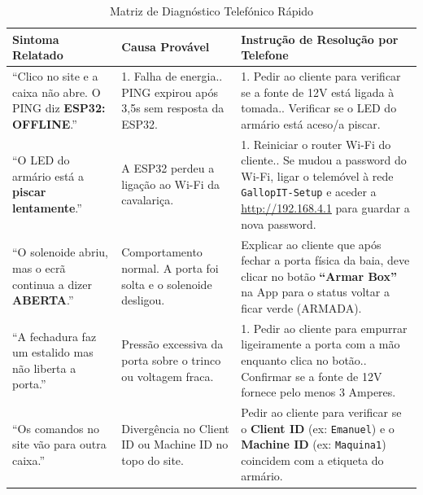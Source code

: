 \documentclass[11pt,a4paper]{article}
\begin{document}
\small
\begin{table}[h!]
\centering
\renewcommand{\arraystretch}{1.25}
\begin{tabular}{@{}p{3.6cm}p{4.2cm}p{8.4cm}@{}}
\toprule
\textbf{Sintoma Relatado} & \textbf{Causa Provável} & \textbf{Instrução de Resolução por Telefone} \\ \midrule
``Clico no site e a caixa não abre. O PING diz \textbf{ESP32: OFFLINE}.'' & 1. Falha de energia.\newline 2. PING expirou após 3,5s sem resposta da ESP32. & 1. Pedir ao cliente para verificar se a fonte de 12V está ligada à tomada.\newline 2. Verificar se o LED do armário está aceso/a piscar. \\ \midrule
``O LED do armário está a \textbf{piscar lentamente}.'' & A ESP32 perdeu a ligação ao Wi-Fi da cavalariça. & 1. Reiniciar o router Wi-Fi do cliente.\newline 2. Se mudou a password do Wi-Fi, ligar o telemóvel à rede \texttt{GallopIT-Setup} e aceder a \url{http://192.168.4.1} para guardar a nova password. \\ \midrule
``O solenoide abriu, mas o ecrã continua a dizer \textbf{ABERTA}.'' & Comportamento normal. A porta foi solta e o solenoide desligou. & Explicar ao cliente que após fechar a porta física da baia, deve clicar no botão \textbf{``Armar Box''} na App para o status voltar a ficar verde (ARMADA). \\ \midrule
``A fechadura faz um estalido mas não liberta a porta.'' & Pressão excessiva da porta sobre o trinco ou voltagem fraca. & 1. Pedir ao cliente para empurrar ligeiramente a porta com a mão enquanto clica no botão.\newline 2. Confirmar se a fonte de 12V fornece pelo menos 3 Amperes. \\ \midrule
``Os comandos no site vão para outra caixa.'' & Divergência no Client ID ou Machine ID no topo do site. & Pedir ao cliente para verificar se o \textbf{Client ID} (ex: \texttt{Emanuel}) e o \textbf{Machine ID} (ex: \texttt{Maquina1}) coincidem com a etiqueta do armário. \\ \bottomrule
\end{tabular}
\caption{Matriz de Diagnóstico Telefónico Rápido}
\end{table}
\end{document}
